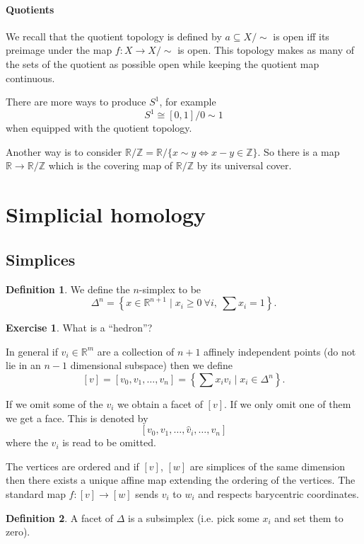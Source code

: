 \documentclass{article}
\theoremstyle{definition}
\newtheorem*{defn}{Definition}
\newtheorem*{exer}{Exercise}
\newcommand{\ZZ}{\mathbb{Z}}
\newcommand{\RR}{\mathbb{R}}
\begin{document}
\paragraph{Quotients}
We recall that the quotient topology is defined by $a \subseteq X/\sim$ is open iff its preimage under the map $f\colon X \to X/\sim$ is open.
This topology makes as many of the sets of the quotient as possible open while keeping the quotient map continuous.

There are more ways to produce $S^1$, for example
\[S^1 \cong [0,1]/0\sim1\]
when equipped with the quotient topology.

Another way is to consider $\RR/\ZZ = \RR/\{x\sim y \iff x-y\in \ZZ\}$.
So there is a map $\RR \to \RR/\ZZ$ which is the covering map of $\RR/\ZZ$ by its universal cover.

\section{Simplicial homology}
\subsection{Simplices}
\begin{defn}
We define the $n$-simplex to be
\[\Delta^n = \left\{x\in \RR^{n+1} \mid x_i \ge 0\ \forall i,\ \sum x_i = 1\right\}.\]
\end{defn}


\begin{exer}
What is a ``hedron''?
\end{exer}

In general if $v_i\in \RR^m$ are a collection of $n+1$ affinely independent points (do not lie in an $n-1$ dimensional subspace) then we define
\[[v] = [v_0,v_1,\ldots,v_n] = \left\{\sum x_i v_i \mid x_i\in \Delta^n\right\}.\]


If we omit some of the $v_i$ we obtain a facet of $[v]$.
If we only omit one of them we get a face.
This is denoted by
\[[v_0,v_1, \ldots, \hat v_i, \ldots , v_n]\]
where the $v_i$ is read to be omitted.

The vertices are ordered and if $[v]$, $[w]$ are simplices of the same dimension then there exists a unique affine map extending the ordering of the vertices.
The standard map $f\colon [v]\to [w]$ sends $v_i$ to $w_i$ and respects barycentric coordinates. 


\begin{defn}
A facet of $\Delta$ is a subsimplex (i.e. pick some $x_i$ and set them to zero).
\end{defn}
\end{document}
